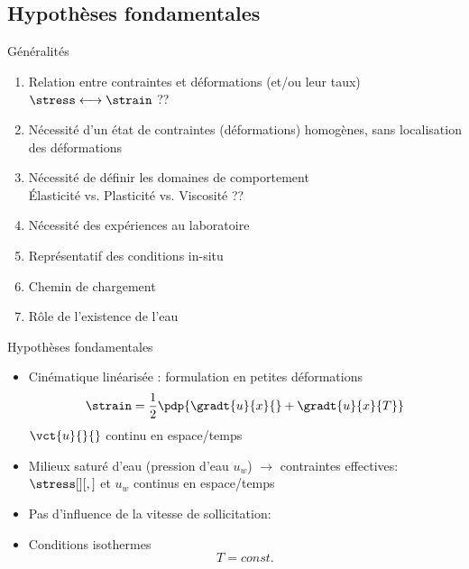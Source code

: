 \subsection{Hypothèses fondamentales}
\label{subsec:modelling_hypothesis}
\begin{frame}{Généralités}
\begin{enumerate}
\item Relation entre contraintes et déformations (et/ou leur taux) \\
$ \stress \longleftrightarrow \strain$ ??
\item Nécessité d'un état de contraintes (déformations) homogènes, sans
localisation des déformations
\item Nécessité de définir les domaines de comportement\\
Élasticité vs. Plasticité vs. Viscosité ??
\item Nécessité des expériences au laboratoire
\item Représentatif des conditions in-situ
\item Chemin de chargement
\item Rôle de l'existence de l'eau
\end{enumerate}
\end{frame}

\begin{frame}{Hypothèses fondamentales}
\begin{itemize}
	\item Cinématique linéarisée : formulation en petites déformations \\ $$\strain=\frac{1}{2}\pdp{\gradt{u}{x}{}+\gradt{u}{x}{T}}$$
	$\vct{u}{}{}$ continu en espace/temps
	\item Milieux saturé d'eau (pression d'eau $u_w$) $\to$ contraintes effectives:
	$\stress[][,]$ et $u_w$ continus en espace/temps
\item Pas d'influence de la vitesse de sollicitation:
\item Conditions isothermes $$T=const.$$
\end{itemize}
\end{frame}


